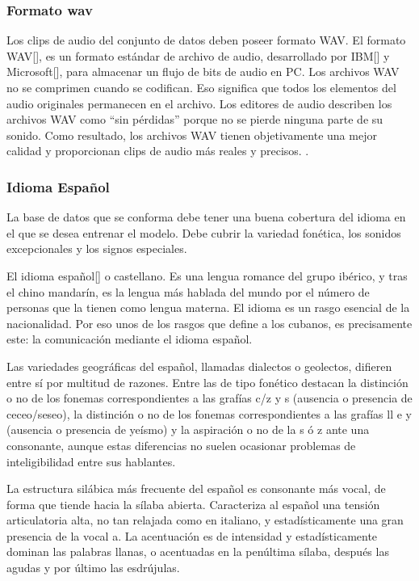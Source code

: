 \subsubsection{Formato wav}
Los clips de audio del conjunto de datos deben poseer formato WAV. El formato WAV[\cite{wav}], es un formato estándar de archivo de audio, desarrollado por IBM[\cite{ibm}] y Microsoft[\cite{microsoft}], para almacenar un flujo de bits de audio en PC. Los archivos WAV no se comprimen cuando se codifican. Eso significa que todos los elementos del audio originales permanecen en el archivo. Los editores de audio describen los archivos WAV como ``sin pérdidas'' porque no se pierde ninguna parte de su sonido. Como resultado, los archivos WAV tienen objetivamente una mejor calidad y proporcionan clips de audio más reales y precisos. .


\subsubsection{Idioma Español}
La base de datos que se conforma debe tener una buena cobertura del idioma en el que se desea entrenar el modelo. Debe cubrir la variedad fonética, los sonidos excepcionales y los signos especiales.

El idioma español[\cite{ecured}] o castellano. Es una lengua romance del grupo ibérico, y tras el chino mandarín, es la lengua más hablada del mundo por el número de personas que la tienen como lengua materna. El idioma es un rasgo esencial de la nacionalidad. Por eso unos de los rasgos que define a los cubanos, es precisamente este: la comunicación mediante el idioma español. 

Las variedades geográficas del español, llamadas dialectos o geolectos, difieren entre sí por multitud de razones. Entre las de tipo fonético destacan la distinción o no de los fonemas correspondientes a las grafías c/z y s (ausencia o presencia de ceceo/seseo), la distinción o no de los fonemas correspondientes a las grafías ll e y (ausencia o presencia de yeísmo) y la aspiración o no de la s ó z ante una consonante, aunque estas diferencias no suelen ocasionar problemas de inteligibilidad entre sus hablantes.

La estructura silábica más frecuente del español es consonante más vocal, de forma que tiende hacia la sílaba abierta. Caracteriza al español una tensión articulatoria alta, no tan relajada como en italiano, y estadísticamente una gran presencia de la vocal a. La acentuación es de intensidad y estadísticamente dominan las palabras llanas, o acentuadas en la penúltima sílaba, después las agudas y por último las esdrújulas. 

